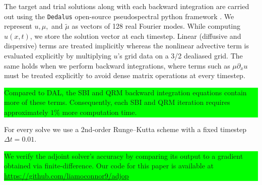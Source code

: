 \documentclass[%
 reprint,
 amsmath,amssymb,
 aps,
 pre,
]{revtex4-2}
\newcommand{\hly}[1]{\colorbox{lime}{\parbox{\columnwidth}{#1}}}
\newcommand\tmu{\tilde{\mu}}
\begin{document}
The target and trial solutions along with each backward integration are carried out using the \texttt{Dedalus} open-source pseudospectral python framework \cite{Burns2020}. 
We represent $u,\mu,$ and $\tmu$ as vectors of 128 real Fourier modes. 
While computing $u(x, t)$, we store the solution vector at each timestep.
Linear (diffusive and dispersive) terms are treated implicitly whereas the nonlinear advective term is evaluated explicitly by multiplying $u$'s grid data on a 3/2 dealiased grid. 
The same holds when we perform backward integrations, where terms such as $\mu\partial_x u$ must be treated explicitly to avoid dense matrix operations at every timestep.
\hly{Compared to DAL, the SBI and QRM backward integration equations contain more of these terms. 
Consequently, each SBI and QRM iteration requires approximately $1\%$ more computation time.}
For every solve we use a 2nd-order Runge--Kutta scheme with a fixed timestep $\Delta t=0.01$.
\hly{We verify the adjoint solver's accuracy by comparing its output to a gradient obtained via finite-difference.
Our code for this paper is available at \url{https://github.com/liamoconnor9/adjop}}
\end{document}
